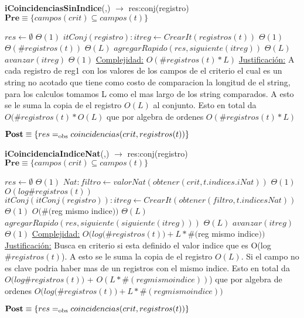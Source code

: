\begin{algorithm}[H]{\textbf{iCoincidenciasSinIndice}(,) $\to$ res:conj(registro)}
	{\\ $\textbf{Pre} \equiv \{campos(crit) \subseteq campos(t)\}$}
	\begin{algorithmic}[1]
		\State $res \gets \emptyset$ \Comment $\Theta(1)$
		\State $itConj(registro): itreg \gets CrearIt(registros(t))$ \Comment	$\Theta(1)$
		 \Comment $\Theta(\#registros(t))$
				\Comment $\Theta(L)$
				\State $agregarRapido(res,siguiente(itreg))$	\Comment $\Theta(L)$
			\EndIf
			\State $avanzar(itreg)$	\Comment $\Theta(1)$
		\EndWhile
		\medskip
		\Statex \underline{Complejidad:} $O(\#registros(t) * L)$
		\Statex \underline{Justificación:} A cada registro de reg1 con los valores de los campos de el criterio el cual es un string no acotado que tiene como costo de comparacion la longitud de el string, para los calculos tomamos L como el mas largo de los string comparados. A esto se le suma la copia de el registro $O(L)$ al conjunto. Esto en total da $O(\#registros(t) * O(L)$ que por algebra de ordenes $O(\#registros(t) * L)$
	\end{algorithmic}
	{$\textbf{Post} \equiv \{res =_{\mathrm{obs}} coincidencias(crit,registros(t))\}$}
\end{algorithm}

\begin{algorithm}[H]{\textbf{iCoincidenciaIndiceNat}(,) $\to$ res:conj(registro)}
	{\\ $\textbf{Pre} \equiv \{campos(crit) \subseteq campos(t)\}$}
	\begin{algorithmic}[1]
		\State $res \gets \emptyset$ \Comment $\Theta(1)$
		\State $Nat: filtro \gets valorNat(obtener(crit,t.indices.iNat))$ \Comment $\Theta(1)$
		 \Comment $O(log \#registros(t))$
			\State $itConj(itConj(registro)): itreg \gets CrearIt(obtener(filtro,t.indicesNat))$ \Comment	$\Theta(1)$
			 \Comment $O(\#($reg mismo indice$))$
					\Comment $\Theta(L)$
					\State $agregarRapido(res,siguiente(siguiente(itreg)))$	\Comment $\Theta(L)$
				\EndIf
				\State $avanzar(itreg)$	\Comment $\Theta(1)$
			\EndWhile
		\EndIf
		\medskip
		\Statex \underline{Complejidad:} $O(log ($\#$registros(t)) + L * \#($reg mismo indice$))$
		\Statex \underline{Justificación:} Busca en criterio si esta definido el valor indice que es O(log $\#registros(t)$). A esto se le suma la copia de el registro $O(L)$. Si el campo no es clave podria haber mas de un registros con el mismo indice. Esto en total da $O(log $\#$registros(t))$ + $O(L*\#(reg mismo indice))$) que por algebra de ordenes $O(log ($\#$registros(t)) + L * \#(reg mismo indice))$
	\end{algorithmic}
	{$\textbf{Post} \equiv \{res =_{\mathrm{obs}} coincidencias(crit,registros(t))\}$}
\end{algorithm}

